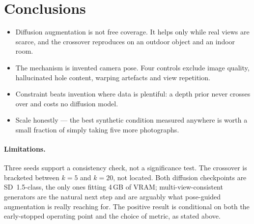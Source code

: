 \documentclass{article}
\begin{document}
\section{Conclusions}

\begin{itemize}[leftmargin=1.4em]
  \item Diffusion augmentation is not free coverage. It helps only while real
  views are scarce, and the crossover reproduces on an outdoor object and an
  indoor room.
  \item The mechanism is invented camera pose. Four controls exclude image
  quality, hallucinated hole content, warping artefacts and view repetition.
  \item Constraint beats invention where data is plentiful: a depth prior never
  crosses over and costs no diffusion model.
  \item Scale honestly --- the best synthetic condition measured anywhere is
  worth a small fraction of simply taking five more photographs.
\end{itemize}

\paragraph{Limitations.} Three seeds support a consistency check, not a
significance test. The crossover is bracketed between $k = 5$ and $k = 20$, not
located. Both diffusion checkpoints are SD~1.5-class, the only ones fitting
4\,GB of VRAM; multi-view-consistent generators are the natural next step and
are arguably what pose-guided augmentation is really reaching for. The positive
result is conditional on both the early-stopped operating point and the choice
of metric, as stated above.



\end{document}
